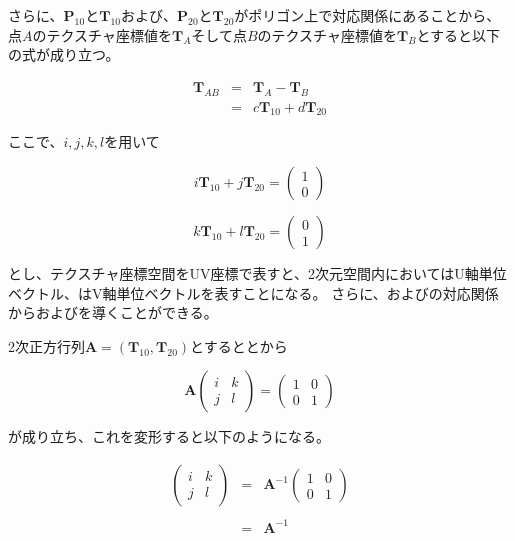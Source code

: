 \noindent
さらに、$\bm{P}_{10}$と$\bm{T}_{10}$および、$\bm{P}_{20}$と$\bm{T}_{20}$がポリゴン上で対応関係にあることから、点$A$のテクスチャ座標値を$\bm{T}_A$そして点$B$のテクスチャ座標値を$\bm{T}_B$とすると以下の式が成り立つ。

\begin{eqnarray}
\bm{T}_{AB} &=& \bm{T}_A - \bm{T}_B\nonumber\\
           &=& c\bm{T}_{10} +  d\bm{T}_{20}  
\label{ETab}
\end{eqnarray}

\noindent
ここで、$i,j,k,l$を用いて

\begin{equation}
i\bm{T}_{10} + j\bm{T}_{20} = 
\begin{pmatrix}
1\\
0
\end{pmatrix}
\label{EUnit2u}
\end{equation}

\begin{equation}
k\bm{T}_{10} + l\bm{T}_{20} = 
\begin{pmatrix}
0\\
1
\end{pmatrix}
\label{EUnit2v}
\end{equation}

\noindent
とし、テクスチャ座標空間をUV座標で表すと、2次元空間内においてはU軸単位ベクトル、はV軸単位ベクトルを表すことになる。
さらに、およびの対応関係からおよびを導くことができる。

2次正方行列$\bm{A} = (\bm{T}_{10}, \bm{T}_{20})$とするととから

\begin{equation}
\bm{A} 
\begin{pmatrix}
i &k\\
j &l
\end{pmatrix}
=
\begin{pmatrix}
1 &0\\
0 &1
\end{pmatrix}
\label{EAx=I}
\end{equation}

\noindent
{}が成り立ち、これを変形すると以下のようになる。

\begin{eqnarray}
\label{EIjkl}
\begin{pmatrix}
i &k\\
j &l
\end{pmatrix}
&=& \bm{A}^{-1}
\begin{pmatrix}
1 &0\\
0 &1
\end{pmatrix}\nonumber\\
\nonumber\\
&=& \bm{A}^{-1}
\end{eqnarray}

